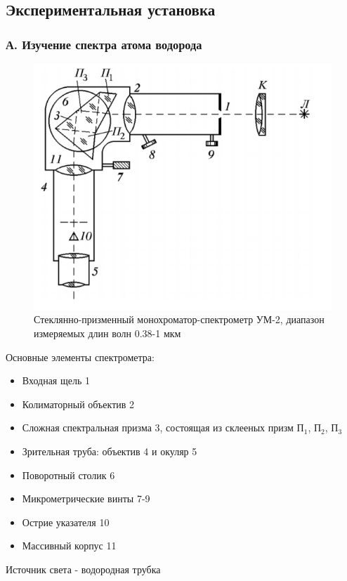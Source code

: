 \documentclass[a4paper,12pt]{article} %
\begin{document}
 
\subsection*{Экспериментальная установка}
\subsubsection*{А. Изучение спектра атома водорода}
\begin{figure} 
\vspace{-5ex}
\includegraphics[width=\linewidth]{установка водород.png}
\caption{Стеклянно-призменный монохроматор-спектрометр УМ-2, диапазон измеряемых длин волн 0.38-1 мкм}
\label{fig:somelabel}
\end{figure}

Основные элементы спектрометра: 
\begin{itemize}
    \item Входная щель 1
    \item Колиматорный объектив 2
    \item Сложная спектральная призма 3, состоящая из склееных призм П$_1$, П$_2$, П$_3$
    \item Зрительная труба: объектив 4 и окуляр 5
    \item Поворотный столик 6
    \item Микрометрические винты 7-9
    \item Острие указателя 10
    \item Массивный корпус 11
\end{itemize}
Источник света - водородная трубка
\end{document}

